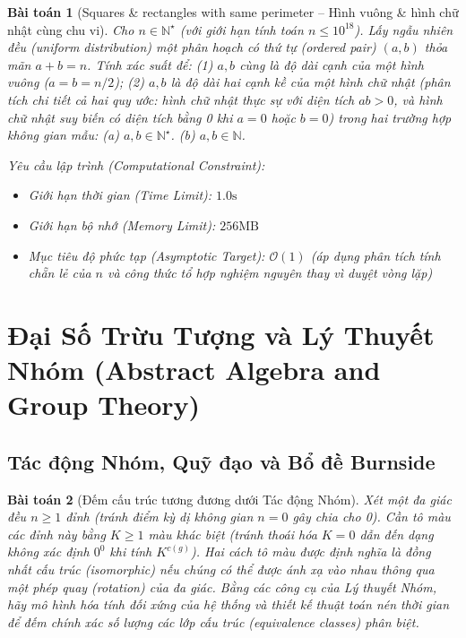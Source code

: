 \documentclass{article}
\newtheorem{baitoan}{Bài toán}
\begin{document}
\begin{baitoan}[Squares \& rectangles with same perimeter -- Hình vuông \& hình chữ nhật cùng chu vi]
	Cho $n\in\mathbb{N}^\star$ (với giới hạn tính toán $n \le 10^{18}$). Lấy ngẫu nhiên đều (uniform distribution) một phân hoạch có thứ tự (ordered pair) $(a, b)$ thỏa mãn $a + b = n$. Tính xác suất để: (1) $a, b$ cùng là độ dài cạnh của một hình vuông ($a = b = n/2$); (2) $a, b$ là độ dài hai cạnh kề của một hình chữ nhật (phân tích chi tiết cả hai quy ước: hình chữ nhật thực sự với diện tích $ab > 0$, và hình chữ nhật suy biến có diện tích bằng 0 khi $a=0$ hoặc $b=0$) trong hai trường hợp không gian mẫu: (a) $a,b\in\mathbb{N}^\star$. (b) $a,b\in\mathbb{N}$.

    \vspace{0.5em}
    \emph{Yêu cầu lập trình (Computational Constraint):}
    \begin{itemize}
        \item Giới hạn thời gian (Time Limit): $1.0\mathrm{s}$
        \item Giới hạn bộ nhớ (Memory Limit): $256\mathrm{MB}$
        \item Mục tiêu độ phức tạp (Asymptotic Target): $\mathcal{O}(1)$ (áp dụng phân tích tính chẵn lẻ của $n$ và công thức tổ hợp nghiệm nguyên thay vì duyệt vòng lặp)
    \end{itemize}
\end{baitoan}


\section{Đại Số Trừu Tượng và Lý Thuyết Nhóm (Abstract Algebra and Group Theory)}
\subsection{Tác động Nhóm, Quỹ đạo và Bổ đề Burnside}

\begin{baitoan}[Đếm cấu trúc tương đương dưới Tác động Nhóm]
Xét một đa giác đều $n \ge 1$ đỉnh (tránh điểm kỳ dị không gian $n=0$ gây chia cho 0). Cần tô màu các đỉnh này bằng $K \ge 1$ màu khác biệt (tránh thoái hóa $K=0$ dẫn đến dạng không xác định $0^0$ khi tính $K^{c(g)}$). Hai cách tô màu được định nghĩa là đồng nhất cấu trúc (isomorphic) nếu chúng có thể được ánh xạ vào nhau thông qua một phép quay (rotation) của đa giác. Bằng các công cụ của Lý thuyết Nhóm, hãy mô hình hóa tính đối xứng của hệ thống và thiết kế thuật toán nén thời gian để đếm chính xác số lượng các lớp cấu trúc (equivalence classes) phân biệt.
\end{baitoan}
\end{document}
